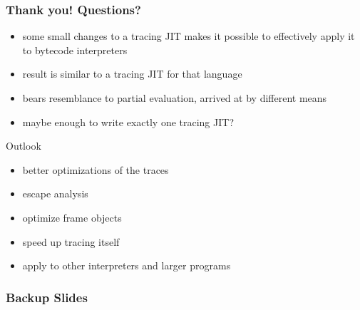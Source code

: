 \documentclass[utf8x]{beamer}
\begin{document}
\begin{frame}
    \frametitle{Thank you! Questions?}
    \begin{itemize}
    \item some small changes to a tracing JIT makes it possible to effectively apply it to bytecode interpreters
    \item result is similar to a tracing JIT for that language
    \item bears resemblance to partial evaluation, arrived at by different means
    \item maybe enough to write exactly one tracing JIT?
    \end{itemize}
    \begin{block}{Outlook}
        \begin{itemize}
        \item better optimizations of the traces
        \item escape analysis
        \item optimize frame objects
        \item speed up tracing itself
        \item apply to other interpreters and larger programs
        \end{itemize}
    \end{block}
\end{frame}

\begin{frame}
    \frametitle{Backup Slides}
\end{frame}

\end{document}
